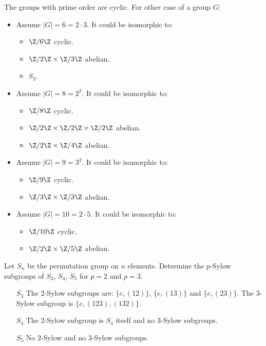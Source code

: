\documentclass[12pt]{book}
\newcommand{\Zm}[1]{\Z/#1\Z} %
\newcounter{myenumi}
\newenvironment{myenumerate}
{\begin{enumerate}
 \setcounter{enumi}{\themyenumi}
}
{\setcounter{myenumi}{\theenumi}
 \end{enumerate}}
\begin{document}
\begin{myenumerate}
The groups with prime order are cyclic. For other case of a group $G$:
\begin{itemize}
  \item Assume \(|G|=6=2\cdot3\). It could be isomorphic to:
    \begin{itemize}
       \item \(\Zm{6}\) cyclic.
       \item \(\Zm{2}\times\Zm{3}\) abelian.
       \item \(S_3\).
    \end{itemize}
  \item Assume \(|G|=8=2^3\). It could be isomorphic to:
    \begin{itemize}
       \item \(\Zm{8}\) cyclic.
       \item \(\Zm{2}\times\Zm{2}\times\Zm{2}\) abelian.
       \item \(\Zm{2}\times\Zm{4}\) abelian.
    \end{itemize}
  \item Assume \(|G|=9=3^2\). It could be isomorphic to:
    \begin{itemize}
       \item \(\Zm{9}\) cyclic.
       \item \(\Zm{3}\times\Zm{3}\) abelian.
    \end{itemize}
  \item Assume \(|G|=10=2\cdot5\). It could be isomorphic to:
    \begin{itemize}
       \item \(\Zm{10}\) cyclic.
       \item \(\Zm{2}\times\Zm{5}\) abelian.
    \end{itemize}

\end{itemize}

\begin{excopy}
Let \(S_n\) be the permutation group on $n$ elements.
Determine the $p$-Sylow subgroups of
\(S_3\), \(S_4\), \(S_5\) for \(p=2\) and \(p=3\).
\end{excopy}

\begin{itemize}
 \item[\(S_3\)]
    The $2$-Sylow subgroups %
    are:
    \(\{e,(12)\}\), \(\{e,(13)\}\) and \(\{e,(23)\}\).
    The $3$-Sylow subgroup is
    \(\{e,(123),(132)\}\).
 \item[\(S_4\)]
    The $2$-Sylow subgroup is \(S_4\) itself and no $3$-Sylow subgroups.
 \item[\(S_5\)] No $2$-Sylow and no $3$-Sylow subgroups.
\end{itemize}


\end{myenumerate}
\end{document}
